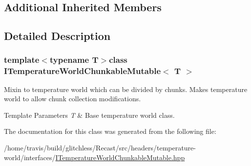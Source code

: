 \subsection*{Additional Inherited Members}


\subsection{Detailed Description}
\subsubsection*{template$<$typename T$>$class I\-Temperature\-World\-Chunkable\-Mutable$<$ T $>$}

Mixin to temperature world which can be divided by chunks. Makes temperature world to allow chunk collection modifications.


\begin{DoxyTemplParams}{Template Parameters}
{\em T} & Base temperature world class. \\
\hline
\end{DoxyTemplParams}


The documentation for this class was generated from the following file\-:\begin{DoxyCompactItemize}
\item 
/home/travis/build/glitchless/\-Recast/src/headers/temperature-\/world/interfaces/\hyperlink{_i_temperature_world_chunkable_mutable_8hpp}{I\-Temperature\-World\-Chunkable\-Mutable.\-hpp}\end{DoxyCompactItemize}
